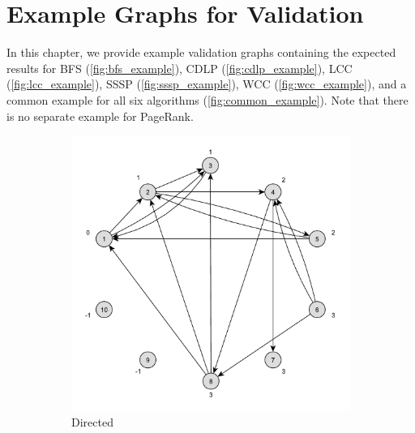 \chapter{Example Graphs for Validation}
\label{chap:validation_examples}

In this chapter, we provide example validation graphs containing the expected results for
BFS (\autoref{fig:bfs_example}),
CDLP (\autoref{fig:cdlp_example}),
LCC (\autoref{fig:lcc_example}),
SSSP (\autoref{fig:sssp_example}),
WCC (\autoref{fig:wcc_example}),
and a common example for all six algorithms (\autoref{fig:common_example}). Note that there is no separate example for PageRank.

\newcommand{\examplescale}{0.41}

\begin{figure}[h]
	\centering
	\begin{subfigure}{0.496\textwidth}
		\centering
		\includegraphics[scale=\examplescale]{figures/examples/bfs-dir.pdf}
		\caption{Directed}
	\end{subfigure}
	\begin{subfigure}{0.496\textwidth}
		\centering

\end{subfigure}
\end{figure}
